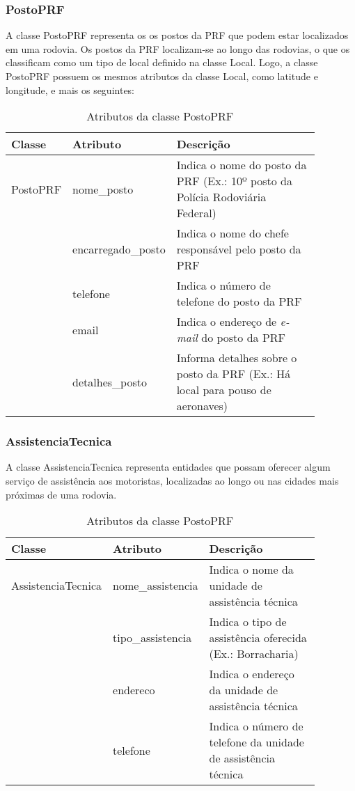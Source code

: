 \subsubsection{\textbf{PostoPRF}}

  A classe PostoPRF representa os os postos da PRF que podem estar localizados em uma rodovia.
  Os postos da PRF localizam-se ao longo das rodovias, o que os classificam como um tipo de local definido na
  classe Local. Logo, a classe PostoPRF possuem os mesmos atributos da classe Local, como latitude e longitude,
  e mais os seguintes:
  
    \begin{table*}[!h]
    \centering
    \begin{tabular}{p{0.15\linewidth}p{0.23\linewidth}p{0.5\linewidth}}
      \hline
      \textbf{Classe} & \textbf{Atributo} & \textbf{Descrição}\\
      \hline
	PostoPRF & nome\_posto & Indica o nome do posto da PRF (Ex.: 10º posto da Polícia Rodoviária Federal)\\
		 & encarregado\_posto & Indica o nome do chefe responsável pelo posto da PRF\\
		 & telefone & Indica o número de telefone do posto da PRF\\
		 & email & Indica o endereço de \textit{e-mail} do posto da PRF\\
		 & detalhes\_posto & Informa detalhes sobre o posto da PRF (Ex.: Há local para pouso de aeronaves)\\
      \hline
    \end{tabular}
    \caption{Atributos da classe PostoPRF}
    \label{tab:attr_postoprf}
    \end{table*}
    
\subsubsection{\textbf{AssistenciaTecnica}}

  A classe AssistenciaTecnica representa entidades que possam oferecer algum serviço de assistência aos motoristas, localizadas 
  ao longo ou nas cidades mais próximas de uma rodovia.
  
    \begin{table*}[!h]
    \centering
    \begin{tabular}{p{0.15\linewidth}p{0.23\linewidth}p{0.5\linewidth}}
      \hline
      \textbf{Classe} & \textbf{Atributo} & \textbf{Descrição}\\
      \hline
	AssistenciaTecnica & nome\_assistencia & Indica o nome da unidade de assistência técnica\\
			   & tipo\_assistencia & Indica o tipo de assistência oferecida (Ex.: Borracharia)\\
			   & endereco & Indica o endereço da unidade de assistência técnica\\
			   & telefone & Indica o número de telefone da unidade de assistência técnica\\
      \hline
    \end{tabular}
    \caption{Atributos da classe PostoPRF}
    \label{tab:attr_postoprf}
    \end{table*}
    
